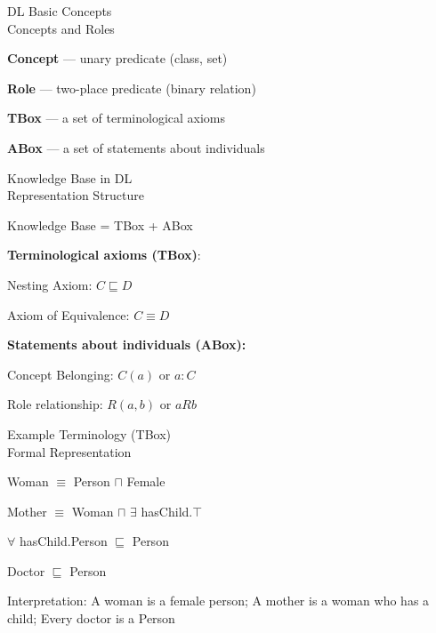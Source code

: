 \begin{frame}{DL Basic Concepts\\Concepts and Roles}
	\topline
	\justifying
	
	\begin{textitemize}
		\item \textbf{Concept} --- unary predicate (class, set)
		\item \textbf{Role} --- two-place predicate (binary relation)
		\item \textbf{TBox} --- a set of terminological axioms
		\item \textbf{ABox} --- a set of statements about individuals
	\end{textitemize}
\end{frame}

\begin{frame}{Knowledge Base in DL\\Representation Structure}
	\topline
	\justifying
	
	Knowledge Base = TBox + ABox
	
	\textbf{Terminological axioms (TBox)}:
	\begin{textitemize}
		\item Nesting Axiom: $C \sqsubseteq D$
		\item Axiom of Equivalence: $C \equiv D$
	\end{textitemize}
	
	\textbf{Statements about individuals (ABox):}
	\begin{textitemize}
		\item Concept Belonging: $C(a)$ or $a:C$
		\item Role relationship: $R(a,b)$ or $aRb$
	\end{textitemize}
\end{frame}

\begin{frame}{Example Terminology (TBox)\\Formal Representation}
	\topline
	\justifying
	\begin{textitemize}
		\item Woman $\equiv$ Person $\sqcap$ Female
		\item Mother $\equiv$ Woman $\sqcap$ $\exists$ hasChild.$\top$
		\item $\forall$ hasChild.Person $\sqsubseteq$ Person
		\item Doctor $\sqsubseteq$ Person
	\end{textitemize}
	
	\vspace{0.5cm}
	Interpretation: A woman is a female person; A mother is a woman who has a child; Every doctor is a Person
\end{frame}

